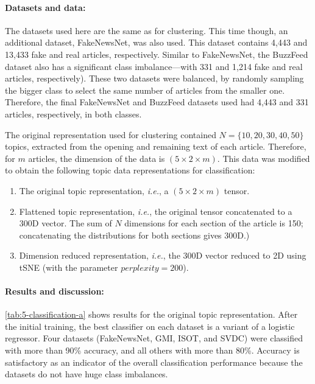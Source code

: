 \paragraph{Datasets and data:}The datasets used here are the same as for clustering.  This time though, an additional dataset, FakeNewsNet, was also used. This dataset contains 4,443 and 13,433 fake and real articles, respectively. Similar to FakeNewsNet, the BuzzFeed dataset also has a significant class imbalance—with 331 and 1,214 fake and real articles, respectively). These two datasets were balanced, by randomly sampling the bigger class to select the same number of articles from the smaller one. Therefore, the final FakeNewsNet and BuzzFeed datasets used had 4,443 and 331 articles, respectively, in both classes.

The original representation used for clustering contained $N = \{ 10, 20, 30, 40, 50 \}$ topics, extracted from the opening and remaining text of each article. Therefore, for $m$ articles, the dimension of the data is $(5 \times 2 \times m)$. This data was modified to obtain the following topic data representations for classification:
\begin{enumerate}
  \item The original topic representation, \emph{i.e.}, a $(5 \times 2 \times m)$ tensor.

  \item Flattened topic representation, \emph{i.e.}, the original tensor concatenated to a 300D vector. The sum of $N$ dimensions for each section of the article is 150; concatenating the distributions for both sections gives 300D.)

  \item Dimension reduced representation, \emph{i.e.}, the 300D vector reduced to 2D using \ac{tSNE} (with the parameter $perplexity = 200$).
\end{enumerate}

\paragraph{Results and discussion:}\autoref{tab:5-classification-a} shows results for the original topic representation. After the initial training, the best classifier on each dataset is a variant of a logistic regressor. Four datasets (FakeNewsNet, GMI, ISOT, and SVDC) were classified with more than 90\% accuracy, and all others with more than 80\%. Accuracy is satisfactory as an indicator of the overall classification performance because the datasets do not have huge class imbalances.

